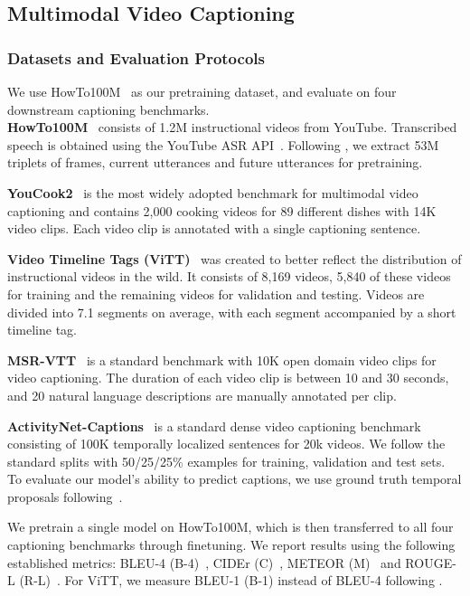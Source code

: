 \documentclass[10pt,twocolumn,letterpaper]{article}
\begin{document}
\subsection{Multimodal Video Captioning}
\label{sec:exp_captioning}


\subsubsection{Datasets and Evaluation Protocols}
We use HowTo100M~\cite{miech2019howto100m} as our pretraining dataset, and evaluate on four downstream captioning benchmarks. \\ \noindent\textbf{HowTo100M}~\cite{miech2019howto100m} consists of 1.2M instructional videos from YouTube. Transcribed speech is obtained using the YouTube ASR API~\cite{youtubeapi}.
Following \cite{seo2021look}, we extract 53M triplets of frames, current utterances and future utterances for pretraining.


\noindent\textbf{YouCook2}~\cite{zhou2018towards} is the most widely adopted benchmark for multimodal video captioning and contains 2,000 cooking videos for 89 different dishes with 14K video clips. 
Each video clip is annotated with a single captioning sentence.

\noindent\textbf{Video Timeline Tags (ViTT)}~\cite{huang2020multimodal} 
was created to better reflect the distribution of instructional videos in the wild. 
It consists of 8,169 videos, 5,840 of these videos for training and the remaining videos for validation and testing. 
Videos are divided into 7.1 segments on average, with each segment accompanied by a short timeline tag.

\noindent\textbf{MSR-VTT}~\cite{xu2016msr} is a standard benchmark with 10K open domain video clips for video captioning.
The duration of each video clip is between 10 and 30 seconds, and 20 natural language descriptions are manually annotated per clip.

\noindent\textbf{ActivityNet-Captions}~\cite{krishna2017dense} is a standard dense video captioning benchmark consisting of 100K temporally localized
sentences for 20k videos. 
We follow the standard splits with 50/25/25\% examples for training, validation and test sets.
To evaluate our model's ability to predict captions, we use ground truth temporal proposals following~\cite{krishna2017dense}.

We pretrain a single model on HowTo100M, which is then transferred to all four captioning benchmarks through finetuning. 
We report results using the following established metrics: BLEU-4 (B-4)~\cite{papineni2002bleu}, CIDEr (C)~\cite{vedantam2015cider}, METEOR (M)~\cite{banerjee2005meteor} and ROUGE-L (R-L)~\cite{lin2004rouge}. 
For ViTT, we measure BLEU-1 (B-1) instead of BLEU-4 following \cite{huang2020multimodal}.
\end{document}
